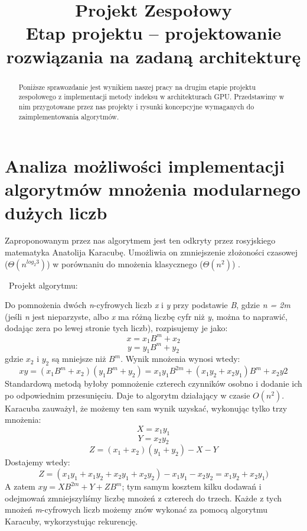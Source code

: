 \documentclass[]{article}
\title{Projekt Zespołowy \\
	Etap projektu – projektowanie rozwiązania na zadaną architekturę}
\author{}
\date{}
\begin{document}
\maketitle

\begin{abstract}

Poniższe sprawozdanie jest wynikiem naszej pracy na drugim etapie projektu zespołowego z implementacji metody indeksu w architekturach GPU. Przedstawimy w nim przygotowane przez nas projekty i rysunki koncepcyjne wymaganych do zaimplementowania algorytmów.



\end{abstract}

\section{Analiza możliwości implementacji algorytmów mnożenia modularnego dużych liczb}
Zaproponowanym przez nas algorytmem jest ten odkryty przez rosyjskiego matematyka Anatolija Karacubę. Umożliwia on zmniejszenie złożoności czasowej ($\Theta(n^{log_{2}3})$) w porównaniu do mnożenia klasycznego ($\Theta(n^2)$) .

~Projekt algorytmu:

Do pomnożenia dwóch \textit{n}-cyfrowych liczb \textit{x} i \textit{y} przy podstawie \textit{B}, gdzie \textit{n = 2m} (jeśli \textit{n} jest nieparzyste, albo \textit{x} ma różną liczbę cyfr niż  \textit{y}, można to naprawić, dodając zera po lewej stronie tych liczb), rozpisujemy je jako:\newline
$$ x = x_{1}B^{m} + x_2 $$
$$ y = y_{1}B^{m} + y_2 $$
gdzie $x_2$ i $y_2$ są mniejsze niż $B^m$. Wynik mnożenia wynosi wtedy:
$$xy = (x_{1}B^{m} + x_2)(y_1B^m + y_2) = x_1y_1B^{2m} + (x_1y_2 + x_2y_1)B^m + x_2y2$$ 
Standardową metodą byłoby pomnożenie czterech czynników osobno i dodanie ich po odpowiednim przesunięciu. Daje to algorytm działający w czasie $\textit{O}(n^{2})$. Karacuba zauważył, że możemy ten sam wynik uzyskać, wykonując tylko trzy mnożenia:
$$X = x_1y_1$$
$$Y = x_2y_2$$
$$Z = (x_1 + x_2)(y_1 + y_2) - X - Y$$
Dostajemy wtedy:
$$ Z = (x_1y_1 + x_1y_2 + x_2y_1 + x_2y_2) - x_1y_1 - x_2y_2 = x_1y_2 + x_2y_1)$$
A zatem $xy = XB^{2m} + Y + ZB^m$; tym samym kosztem kilku dodawań i odejmowań zmniejszyliśmy liczbę mnożeń z czterech do trzech.\newline
Każde z tych mnożeń \textit{m}-cyfrowych liczb możemy znów wykonać za pomocą algorytmu Karacuby, wykorzystując rekurencję.
\end{document}
